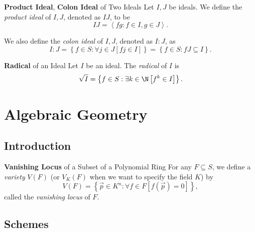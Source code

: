 \documentclass[11pt]{article}
\begin{document}
    \begin{definition}{\textbf{Product Ideal}, \textbf{Colon Ideal} of Two Ideals}
        Let $I,J$ be ideals. We define the \emph{product ideal} of $I,J$, denoted as $IJ$, to be
        \begin{equation*}
            IJ = \left< fg: f\in I, g\in J \right> .
        \end{equation*}

        We also define the \emph{colon ideal} of $I,J$, denoted as $I:J$, as
        \begin{equation*}
            I:J = \left\lbrace f\in S: \forall j\in J\left[ fj\in I \right] \right\rbrace = \left\lbrace f\in S: fJ\subseteq I \right\rbrace.
        \end{equation*}
    \end{definition}
    
    \begin{definition}{\textbf{Radical} of an Ideal}
        Let $I$ be an ideal. The \emph{radical} of $I$ is
        \begin{equation*}
            \sqrt{I} = \left\lbrace f\in S: \exists k\in\N\left[ f^k\in I \right] \right\rbrace.
        \end{equation*}
    \end{definition}

    \section{Algebraic Geometry}

    \subsection{Introduction}

    \begin{definition}{\textbf{Vanishing Locus} of a Subset of a Polynomial Ring}
        For any $F\subseteq S$, we define a \emph{variety} $V\left( F \right)$ (or $V_K\left( F \right)$ when we want to specify the field $K$) by
        \begin{equation*}
            V\left( F \right) = \left\lbrace \vec{p}\in K^n: \forall f\in F\left[ f\left( \vec{p} \right) = 0 \right] \right\rbrace,
        \end{equation*}
        called the \emph{vanishing locus} of $F$.
    \end{definition}
    
    \subsection{Schemes}
    
\end{document}
